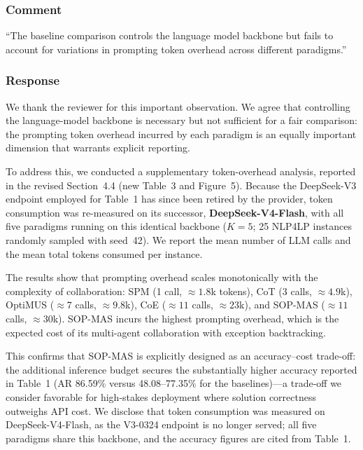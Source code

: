 \documentclass[11pt,a4paper]{article}
\begin{document}
\subsubsection{Comment}
``The baseline comparison controls the language model backbone but fails to account for variations in prompting token overhead across different paradigms.''

\subsubsection{Response}
We thank the reviewer for this important observation. We agree that controlling the language-model backbone is necessary but not sufficient for a fair comparison: the prompting token overhead incurred by each paradigm is an equally important dimension that warrants explicit reporting.

To address this, we conducted a supplementary token-overhead analysis, reported in the revised Section~4.4 (new Table~3 and Figure~5). Because the DeepSeek-V3 endpoint employed for Table~1 has since been retired by the provider, token consumption was re-measured on its successor, \textbf{DeepSeek-V4-Flash}, with all five paradigms running on this identical backbone ($K{=}5$; 25 NLP4LP instances randomly sampled with seed~42). We report the mean number of LLM calls and the mean total tokens consumed per instance.

The results show that prompting overhead scales monotonically with the complexity of collaboration: SPM (1 call, ${\approx}1.8$k tokens), CoT (3 calls, ${\approx}4.9$k), OptiMUS (${\approx}7$ calls, ${\approx}9.8$k), CoE (${\approx}11$ calls, ${\approx}23$k), and SOP-MAS (${\approx}11$ calls, ${\approx}30$k). SOP-MAS incurs the highest prompting overhead, which is the expected cost of its multi-agent collaboration with exception backtracking.

This confirms that SOP-MAS is explicitly designed as an accuracy--cost trade-off: the additional inference budget secures the substantially higher accuracy reported in Table~1 (AR 86.59\% versus 48.08--77.35\% for the baselines)---a trade-off we consider favorable for high-stakes deployment where solution correctness outweighs API cost. We disclose that token consumption was measured on DeepSeek-V4-Flash, as the V3-0324 endpoint is no longer served; all five paradigms share this backbone, and the accuracy figures are cited from Table~1.
\end{document}
